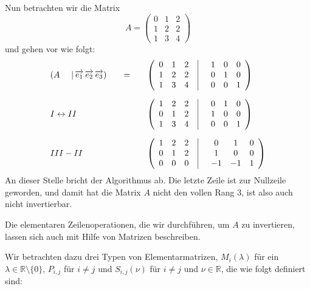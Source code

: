 \begin{beispiel} Nun betrachten wir die Matrix
   	$$ A = \left(\begin{matrix} 0 & 1 & 2 \\ 1 & 2 & 2 \\ 1 & 3 & 4 \end{matrix} \right) $$
und gehen vor wie folgt:
 	 $$ \begin{array} {l c l}
     	\left( A \quad  \, \, \vert \, \overrightarrow{e_1} \, \overrightarrow{e_2} \, \overrightarrow{e_3} \right) 
    	& \quad = \quad & 
     	\left(\begin{array} {c c c | c c c}  0 & 1 & 2 \phantom{x} &  \quad  1 & 0 & 0 \\ 
	1 & 2 & 2 \phantom{x} &  \quad  0 & 1 & 0 \\ 
	1 & 3 & 4 \phantom{x} &  \quad  0 & 0 & 1  \end{array} \right) \\[2.2em] 
  	I \leftrightarrow II & & 
  	\left(\begin{array} {c c c | c c c}  1 & 2 & 2 \phantom{x} &  \quad  0 & 1 & 0 \\ 
	0 & 1 & 2 \phantom{x} &  \quad  1 & 0 & 0 \\ 
	1 & 3 & 4 \phantom{x} &  \quad  0 & 0 & 1   \end{array} \right) \\[2.2em] 
  	III - II & & 
  	\left(\begin{array} {c c c | c c c}  1 & 2 & 2 \phantom{x} &  \quad  0 & 1 & 0 \\ 
	0 & 1 & 2 \phantom{x} &  \quad  1 & 0 & 0 \\ 
	0 & 0 & 0 \phantom{x} &  \quad  -1 & -1 & 1  \end{array} \right) 
    	\end{array} $$
An dieser Stelle bricht der Algorithmus ab. Die letzte Zeile ist zur Nullzeile geworden, und damit hat die 
Matrix $A$ nicht den vollen Rang 3, ist also auch nicht invertierbar. 
\end{beispiel}

\bigbreak

Die elementaren Zeilenoperationen, die wir durchführen, um $A$ zu invertieren, 
lassen sich auch mit Hilfe von Matrizen beschreiben.

Wir betrachten dazu drei Typen von Elementarmatrizen, $M_i(\lambda)$ für ein 
$\lambda \in \mathbb R \setminus \{ 0 \}$, $P_{i,j}$ für $i \neq j$ und 
$S_{i,j}(\nu)$ für $i \neq j$ und $\nu \in \mathbb R$, die wie folgt 
definiert sind:

